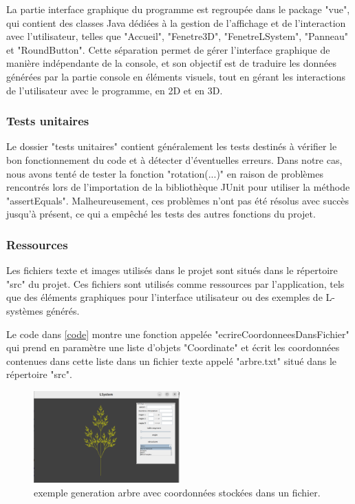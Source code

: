 	La partie interface graphique du programme est regroupée dans le package "vue", qui contient des classes Java dédiées à la gestion de l'affichage et de l'interaction avec l'utilisateur, telles que "Accueil", "Fenetre3D", "FenetreLSystem", "Panneau" et "RoundButton". Cette séparation permet de gérer l'interface graphique de manière indépendante de la console, et son objectif est de traduire les données générées par la partie console en éléments visuels, tout en gérant les interactions de l'utilisateur avec le programme, en 2D et en 3D.

    
    \subsubsection{Tests unitaires}  Le dossier "tests unitaires" contient généralement les tests destinés à vérifier le bon fonctionnement du code et à détecter d'éventuelles erreurs. Dans notre cas, nous avons  tenté de tester la fonction "rotation(...)" en raison de problèmes rencontrés lors de l'importation de la bibliothèque JUnit pour utiliser la méthode "assertEquals". Malheureusement, ces problèmes n'ont pas été résolus avec succès jusqu'à présent, ce qui a empêché les tests des autres fonctions du projet.

    \subsubsection{Ressources }
    \label{intro}Les fichiers texte et images utilisés dans le projet sont situés dans le répertoire "src" du projet. Ces fichiers sont utilisés comme ressources par l'application, tels que des éléments graphiques pour l'interface utilisateur ou des exemples de L-systèmes générés.

    Le code dans \ref{code} montre une fonction appelée "ecrireCoordonneesDansFichier" qui prend en paramètre une liste d'objets "Coordinate" et écrit les coordonnées contenues dans cette liste dans un fichier texte appelé "arbre.txt" situé dans le répertoire "src".
\begin{figure}[h!]
  \centering
  \includegraphics[width=0.5\textwidth]{images/fichiarbre.png}
  \caption{exemple generation arbre avec coordonnées stockées dans un fichier.}
  \label{fig:org}
\end{figure}


